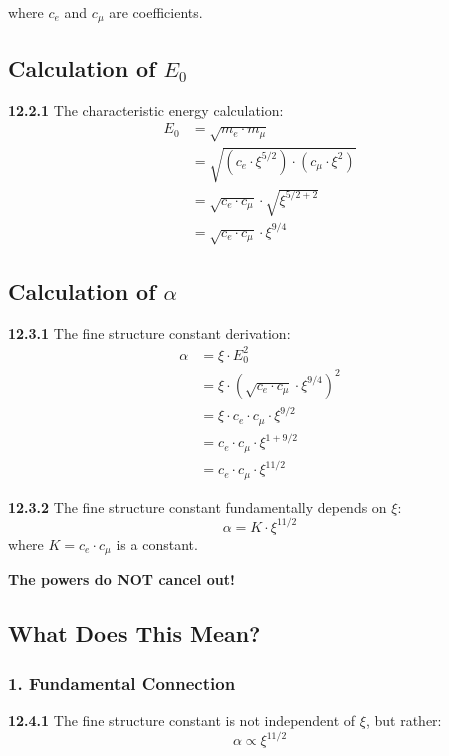 where $c_e$ and $c_\mu$ are coefficients.

\subsection{Calculation of $E_0$}

\noindent \textbf{12.2.1} The characteristic energy calculation:
\begin{align}
	E_0 &= \sqrt{m_e \cdot m_\mu} \\
	&= \sqrt{(c_e \cdot \xi^{5/2}) \cdot (c_\mu \cdot \xi^2)} \\
	&= \sqrt{c_e \cdot c_\mu} \cdot \sqrt{\xi^{5/2 + 2}} \\
	&= \sqrt{c_e \cdot c_\mu} \cdot \xi^{9/4}
\end{align}

\subsection{Calculation of $\alpha$}

\noindent \textbf{12.3.1} The fine structure constant derivation:
\begin{align}
	\alpha &= \xi \cdot E_0^2 \\
	&= \xi \cdot (\sqrt{c_e \cdot c_\mu} \cdot \xi^{9/4})^2 \\
	&= \xi \cdot c_e \cdot c_\mu \cdot \xi^{9/2} \\
	&= c_e \cdot c_\mu \cdot \xi^{1 + 9/2} \\
	&= c_e \cdot c_\mu \cdot \xi^{11/2}
\end{align}

\begin{tcolorbox}[colback=red!5!white,colframe=red!75!black,title=\textbf{IMPORTANT RESULT}]
	\noindent \textbf{12.3.2} The fine structure constant fundamentally depends on $\xi$:
	\begin{equation}
		\boxed{\alpha = K \cdot \xi^{11/2}}
	\end{equation}
	where $K = c_e \cdot c_\mu$ is a constant.
	
	\textbf{The powers do NOT cancel out!}
\end{tcolorbox}

\subsection{What Does This Mean?}

\subsubsection{1. Fundamental Connection}
\noindent \textbf{12.4.1} The fine structure constant is not independent of $\xi$, but rather:
\begin{equation}
	\alpha \propto \xi^{11/2}
\end{equation}

